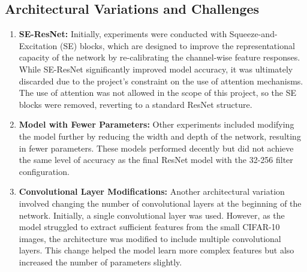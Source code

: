 \documentclass[twoside, 11pt]{article}
\begin{document}
\subsection{Architectural Variations and Challenges}
\begin{enumerate}
    \item \textbf{SE-ResNet:} Initially, experiments were conducted with Squeeze-and-Excitation (SE) blocks, which are designed to improve the representational capacity of the network by re-calibrating the channel-wise feature responses. While SE-ResNet significantly improved model accuracy, it was ultimately discarded due to the project’s constraint on the use of attention \cite{openai2023chatgpt} mechanisms. The use of attention was not allowed in the scope of this project, so the SE blocks were removed, reverting to a standard ResNet structure.
    \item \textbf{Model with Fewer Parameters:} Other experiments included modifying the model further by reducing the width and depth of the network, resulting in fewer parameters. These models performed decently but did not achieve the same level of accuracy as the final ResNet model with the 32-256 filter configuration.
    \item \textbf{Convolutional Layer Modifications:} Another architectural variation involved changing the number of convolutional layers at the beginning of the network. Initially, a single convolutional layer was used. However, as the model struggled to extract sufficient features from the small CIFAR-10 images, the architecture was modified to include multiple convolutional layers. This change helped the model learn more complex features but also increased the number of parameters slightly.
\end{enumerate}


\begin{table}[ht]
    \centering
    \label{table:models_comparison}
\end{table}
\vspace{-0.5cm}
\end{document}
